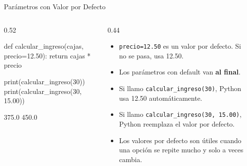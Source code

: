 \documentclass[aspectratio=169, 11pt]{beamer}
\begin{document}
\begin{frame}[fragile,shrink=28]{Parámetros con Valor por Defecto}
  \vspace{-6pt}
  \begin{columns}[T]
    \begin{column}{0.52\textwidth}
      \vspace{2pt}
      \begin{pyblock}
def calcular_ingreso(cajas, precio=12.50):
    return cajas * precio

print(calcular_ingreso(30))
print(calcular_ingreso(30, 15.00))
      \end{pyblock}
      \vspace{-2pt}
      \begin{outputblock}
375.0
450.0
      \end{outputblock}
    \end{column}

    \begin{column}{0.44\textwidth}
      \vspace{2pt}
      {\scriptsize\color{textMuted}
      \begin{itemize}\setlength{\itemsep}{4pt}
        \item[{\color{arcaRed}\scriptsize\faArrowRight}]
          \texttt{precio=12.50} es un valor por defecto.
          Si no se pasa, usa 12.50.
        \item[{\color{arcaRed}\scriptsize\faArrowRight}]
          Los parámetros con default van \textbf{al final}.
        \item[{\color{arcaRed}\scriptsize\faArrowRight}]
          Si llamo \texttt{calcular\_ingreso(30)},
          Python usa 12.50 automáticamente.
        \item[{\color{arcaRed}\scriptsize\faArrowRight}]
          Si llamo \texttt{calcular\_ingreso(30, 15.00)},
          Python reemplaza el valor por defecto.
        \item[{\color{arcaRed}\scriptsize\faLightbulb}]
          Los valores por defecto son útiles cuando
          una opción se repite mucho y solo a veces cambia.
      \end{itemize}
      }
    \end{column}
  \end{columns}
\end{frame}
\end{document}
